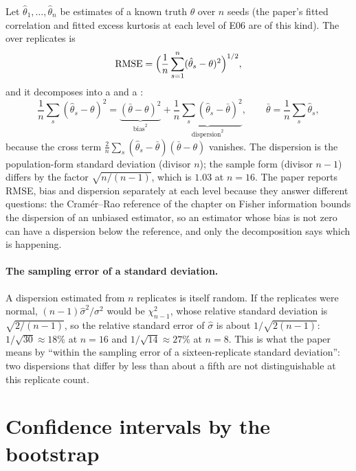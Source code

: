 Let $\hat\theta_1,\dots,\hat\theta_n$ be estimates of a known truth $\theta$ over $n$
seeds (the paper's fitted correlation and fitted excess kurtosis at each level of
E06 are of this kind). The  over replicates is
\begin{equation}
  \mathrm{RMSE}=\Bigl(\frac1n\sum_{s=1}^n(\hat\theta_s-\theta)^2\Bigr)^{1/2},
\end{equation}
and it decomposes into a  and a :
\begin{equation}
  \frac1n\sum_s(\hat\theta_s-\theta)^2=\underbrace{(\bar\theta-\theta)^2}_{\text{bias}^2}
  +\underbrace{\frac1n\sum_s(\hat\theta_s-\bar\theta)^2}_{\text{dispersion}^2},
  \qquad \bar\theta=\frac1n\sum_s\hat\theta_s ,
  \label{eq:rmse-decomp}
\end{equation}
because the cross term $\tfrac2n\sum_s(\hat\theta_s-\bar\theta)(\bar\theta-\theta)$
vanishes. The dispersion is the population-form standard deviation (divisor $n$);
the sample form (divisor $n-1$) differs by the factor $\sqrt{n/(n-1)}$, which is
$1.03$ at $n=16$. The paper reports RMSE, bias and dispersion separately at each level
because they answer different questions: the Cram\'er--Rao reference of the chapter on
Fisher information bounds the dispersion of an unbiased estimator, so an estimator
whose bias is not zero can have a dispersion below the reference, and only the
decomposition says which is happening.

\paragraph{The sampling error of a standard deviation.}
A dispersion estimated from $n$ replicates is itself random. If the replicates were
normal, $(n-1)\hat\sigma^2/\sigma^2$ would be $\chi^2_{n-1}$, whose relative standard
deviation is $\sqrt{2/(n-1)}$, so the relative standard error of $\hat\sigma$ is about
$1/\sqrt{2(n-1)}$: $1/\sqrt{30}\approx18\%$ at $n=16$ and $1/\sqrt{14}\approx27\%$ at
$n=8$. This is what the paper means by ``within the sampling error of a
sixteen-replicate standard deviation'': two dispersions that differ by less than about
a fifth are not distinguishable at this replicate count.

\section{Confidence intervals by the bootstrap}
\label{sec:bootstrap}

